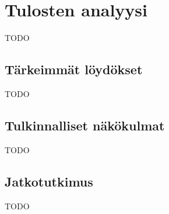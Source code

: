 \vspace{21.5pt}
\chapter{Tulosten analyysi}
TODO

\section{Tärkeimmät löydökset}

TODO

\section{Tulkinnalliset näkökulmat}

TODO

\section{Jatkotutkimus}

TODO